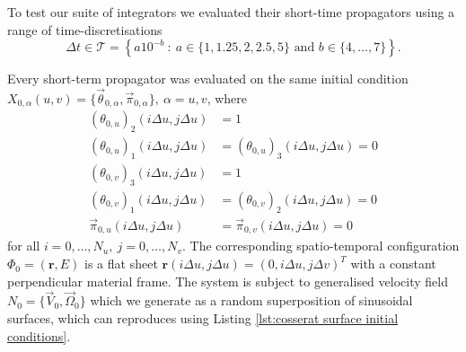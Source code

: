 \documentclass[]{cam-thesis}
\begin{document}
To test our suite of integrators we evaluated their short-time propagators using a range of time-discretisations
\begin{equation} \label{eq:cosserat surface dts}
	\Delta t \in \mathcal{T} = \left\{ a 10^{-b}\ :\ a \in \{1, 1.25, 2, 2.5, 5 \} \text{ and } b \in \{ 4, \dots, 7 \} \right\}.
\end{equation}

Every short-term propagator was evaluated on the same initial condition $X_{0,\alpha}(u,v) = \{ \vec{\theta}_{0,\alpha}, \vec{\pi}_{0,\alpha} \},\ \alpha=u,v$, where
\begin{subequations}
	\begin{align}
		(\theta_{0,u})_2(i\Delta u, j \Delta u) & = 1 \\
		(\theta_{0,u})_1(i\Delta u, j \Delta u) & = (\theta_{0,u})_3(i\Delta u, j \Delta u) = 0 \\
		(\theta_{0,v})_3(i\Delta u, j \Delta u) & = 1 \\
		(\theta_{0,v})_1(i\Delta u, j \Delta u) & = (\theta_{0,v})_2(i\Delta u, j \Delta u) = 0 \\
		\vec{\pi}_{0,u}(i\Delta u, j \Delta u) & = \vec{\pi}_{0,v}(i\Delta u, j \Delta u) = 0
	\end{align}
\end{subequations}
for all $i = 0,\dots, N_u,\ j=0,\dots,N_v$. The corresponding spatio-temporal configuration $\Phi_0 = (\mathbf{r}, E)$ is a flat sheet $\mathbf{r}(i \Delta u, j \Delta u)  = (0, i \Delta u, j \Delta v )^T$ with a constant perpendicular material frame. The system is subject to generalised velocity field $N_0 = \{ \vec{V}_0, \vec{\Omega}_0 \}$ which we generate as a random superposition of sinusoidal surfaces, which can reproduces using Listing \ref{lst:cosserat surface initial conditions}.
\end{document}
